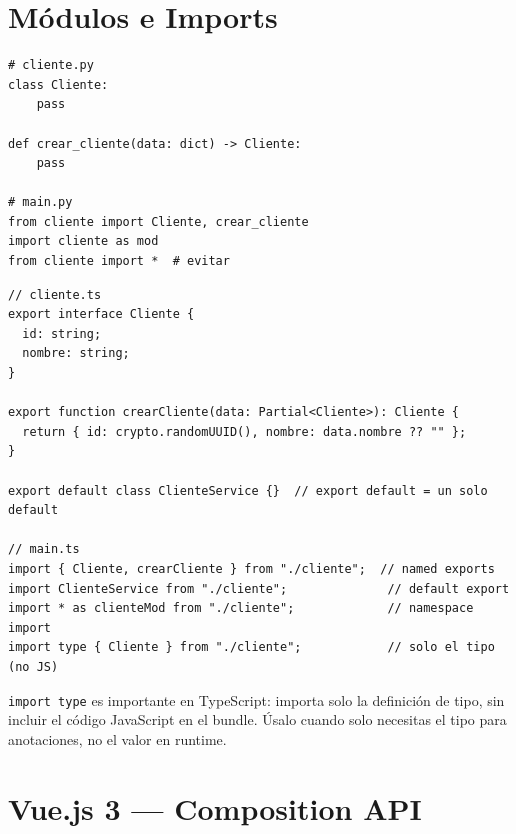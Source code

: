\documentclass[11pt,a4paper]{article}
\begin{document}
\section{Módulos e Imports}

\begin{pybox}
\begin{lstlisting}[style=python]
# cliente.py
class Cliente:
    pass

def crear_cliente(data: dict) -> Cliente:
    pass

# main.py
from cliente import Cliente, crear_cliente
import cliente as mod
from cliente import *  # evitar
\end{lstlisting}
\end{pybox}

\begin{tsbox}
\begin{lstlisting}[style=typescript]
// cliente.ts
export interface Cliente {
  id: string;
  nombre: string;
}

export function crearCliente(data: Partial<Cliente>): Cliente {
  return { id: crypto.randomUUID(), nombre: data.nombre ?? "" };
}

export default class ClienteService {}  // export default = un solo default

// main.ts
import { Cliente, crearCliente } from "./cliente";  // named exports
import ClienteService from "./cliente";              // default export
import * as clienteMod from "./cliente";             // namespace import
import type { Cliente } from "./cliente";            // solo el tipo (no JS)
\end{lstlisting}
\end{tsbox}

\begin{tipbox}
\texttt{import type} es importante en TypeScript: importa solo la definición de tipo,
sin incluir el código JavaScript en el bundle. Úsalo cuando solo necesitas el tipo
para anotaciones, no el valor en runtime.
\end{tipbox}

\section{Vue.js 3 — Composition API}
\end{document}
